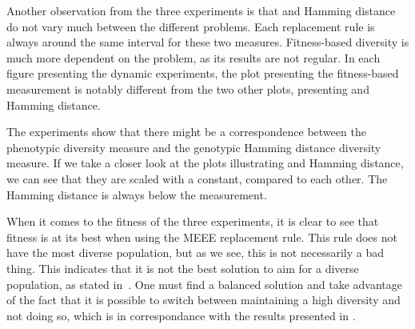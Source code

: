 Another observation from the three experiments is that \dia{} and Hamming distance do not vary much between the different problems. Each replacement rule is always around the same interval for these two measures. Fitness-based diversity is much more dependent on the problem, as its results are not regular. In each figure presenting the dynamic experiments, the plot presenting the fitness-based measurement is notably different from the two other plots, presenting \dia{} and Hamming distance.

The experiments show that there might be a correspondence between the phenotypic \dia{} diversity measure and the genotypic Hamming distance diversity measure. If we take a closer look at the plots illustrating \dia{} and Hamming distance, we can see that they are scaled with a constant, compared to each other. The Hamming distance is always below the \dia{} measurement.%

When it comes to the fitness of the three experiments, it is clear to see that fitness is at its best when using the MEEE replacement rule. This rule does not have the most diverse population, but as we see, this is not necessarily a bad thing. This indicates that it is not the best solution to aim for a  diverse population, as stated in~\cite{Darwen00doesextra}. One must find a balanced solution and take advantage of the fact that it is possible to switch between maintaining a high diversity and not doing so, which is in correspondance with the results presented in \cite{Darwen00doesextra}.
